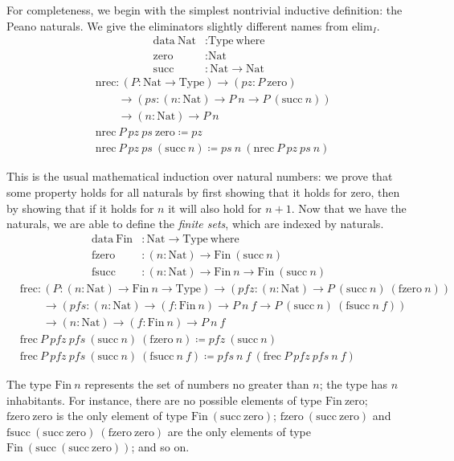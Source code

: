 \documentclass{report}
\newcommand{\Nat}{\const{Nat}}
\newcommand{\zero}{\const{zero}}
\renewcommand{\succ}{\const{succ}}
\newcommand{\Fin}{\const{Fin}}
\newcommand{\fzero}{\const{fzero}}
\newcommand{\fsucc}{\const{fsucc}}
\newcommand{\const}[1]{\text{#1}}
\newcommand{\data}{\const{data}}
\newcommand{\Type}{\const{Type}}
\newcommand{\where}{\const{where}}
\begin{document}
For completeness, we begin with the simplest nontrivial inductive definition: the Peano naturals. We give the eliminators slightly different names from $\const{elim}_I$.
%
\begin{align*}
    \data ~ \Nat &: \Type ~ \where \\
    \zero &: \Nat \\
    \succ &: \Nat \to \Nat
\end{align*}
%
\begin{align*}
    &\const{nrec} : (P : \Nat \to \Type) \to (pz: P ~ \zero) \\
    &\qquad\to (ps: (n: \Nat) \to P ~ n \to P ~ (\succ ~ n)) \\
    &\qquad\to (n: \Nat) \to P ~ n \\
    &\const{nrec} ~ P ~ pz ~ ps ~ \zero \coloneqq pz \\
    &\const{nrec} ~ P ~ pz ~ ps ~ (\succ ~ n) \coloneqq ps ~ n ~ (\const{nrec} ~ P ~ pz ~ ps ~ n)
\end{align*}

This is the usual mathematical induction over natural numbers: we prove that some property holds for all naturals by first showing that it holds for zero, then by showing that if it holds for $n$ it will also hold for $n+1$. Now that we have the naturals, we are able to define the \emph{finite sets}, which are indexed by naturals.
%
\begin{align*}
    \data ~ \Fin &: \Nat \to \Type ~ \where \\
    \fzero &: (n: \Nat) \to \Fin ~ (\succ ~ n) \\
    \fsucc &: (n: \Nat) \to \Fin ~ n \to \Fin ~ (\succ ~ n)
\end{align*}
%
\begin{align*}
    &\const{frec} : (P : (n: \Nat) \to \Fin ~ n \to \Type) \to (pfz: (n: \Nat) \to P ~ (\succ ~ n) ~ (\fzero ~ n)) \\
    &\qquad\to (pfs: (n: \Nat) \to (f: \Fin ~ n) \to P ~ n ~ f \to P ~ (\succ ~ n) ~ (\fsucc ~ n ~ f)) \\
    &\qquad\to (n: \Nat) \to (f: \Fin ~ n) \to P ~ n ~ f \\
    &\const{frec} ~ P ~ pfz ~ pfs ~ (\succ ~ n) ~ (\fzero ~ n) \coloneqq pfz ~ (\succ ~ n) \\
    &\const{frec} ~ P ~ pfz ~ pfs ~ (\succ ~ n) ~ (\fsucc ~ n ~ f) \coloneqq pfs ~ n ~ f ~ (\const{frec} ~ P ~ pfz ~ pfs ~ n ~ f)
\end{align*}

The type $\Fin ~ n$ represents the set of numbers no greater than $n$; the type has $n$ inhabitants. For instance, there are no possible elements of type $\Fin ~ \zero$; $\fzero ~ \zero$ is the only element of type $\Fin ~ (\succ ~ \zero)$; $\fzero ~ (\succ ~ \zero)$ and $\fsucc ~ (\succ ~ \zero) ~ (\fzero ~ \zero)$ are the only elements of type $\Fin ~ (\succ ~ (\succ ~ \zero))$; and so on.
\end{document}
